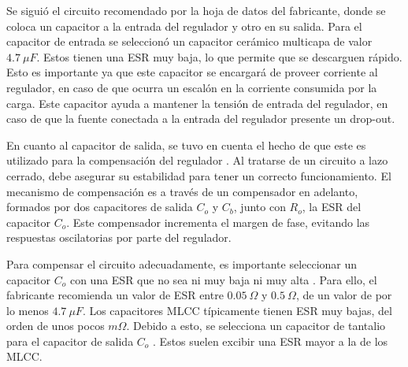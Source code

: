 Se siguió el circuito recomendado por la hoja de datos del fabricante, donde se coloca un capacitor a la entrada del regulador y otro en su salida. Para el capacitor de entrada se seleccionó un capacitor cerámico multicapa de valor $4.7 \ \mu F$. Estos tienen una ESR muy baja, lo que permite que se descarguen rápido. Esto es importante ya que este capacitor se encargará de proveer corriente al regulador, en caso de que ocurra un escalón en la corriente consumida por la carga. Este capacitor ayuda a mantener la tensión de entrada del regulador, en caso de que la fuente conectada a la entrada del regulador presente un drop-out. 

En cuanto al capacitor de salida, se tuvo en cuenta el hecho de que este es utilizado para la compensación del regulador \cite{TOSHIBALDO}. Al tratarse de un circuito a lazo cerrado, debe asegurar su estabilidad para tener un correcto funcionamiento. El mecanismo de compensación es a través de un compensador en adelanto, formados por dos capacitores de salida $C_o$ y $C_b$, junto con $R_o$, la ESR del capacitor $C_o$. Este compensador incrementa el margen de fase, evitando las respuestas oscilatorias por parte del regulador.

Para compensar el circuito adecuadamente, es importante seleccionar un capacitor $C_o$ con una ESR que no sea ni muy baja ni muy alta \cite{SLVA072}. Para ello, el fabricante recomienda un valor de ESR entre $0.05 \ \Omega$ y $0.5 \  \Omega$, de un valor de por lo menos $4.7 \ \mu F$. Los capacitores MLCC típicamente tienen ESR muy bajas, del orden de unos pocos $m \Omega$. Debido a esto, se selecciona un capacitor de tantalio para el capacitor de salida  $C_o$ \cite{AN1482}. Estos suelen excibir una ESR mayor a la de los MLCC. %




